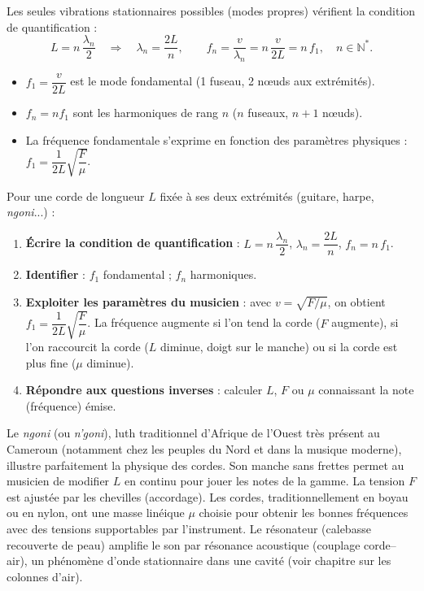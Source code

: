 \documentclass[11pt]{article}
\newcommand{\cle}[1]{{\popxbold\color{popdark}#1}}
\begin{document}
\begin{propriete}
Les seules vibrations stationnaires possibles (modes propres) vérifient la condition de quantification :
\[ L = n\,\frac{\lambda_n}{2} \quad \Rightarrow \quad \lambda_n = \frac{2L}{n}, \qquad f_n = \frac{v}{\lambda_n} = n\,\frac{v}{2L} = n\,f_1, \quad n \in \mathbb{N}^{*}. \]
\begin{itemize}
\item $f_1 = \dfrac{v}{2L}$ est le \cle{mode fondamental} (1 fuseau, 2 nœuds aux extrémités).
\item $f_n = n f_1$ sont les \cle{harmoniques} de rang $n$ ($n$ fuseaux, $n+1$ nœuds).
\item La fréquence fondamentale s'exprime en fonction des paramètres physiques : $f_1 = \dfrac{1}{2L}\sqrt{\dfrac{F}{\mu}}$.
\end{itemize}
\end{propriete}

\begin{methode}
Pour une corde de longueur $L$ fixée à ses deux extrémités (guitare, harpe, \emph{ngoni}...) :
\begin{enumerate}
\item \textbf{Écrire la condition de quantification} : $L = n\,\dfrac{\lambda_n}{2}$, $\lambda_n = \dfrac{2L}{n}$, $f_n = n\,f_1$.
\item \textbf{Identifier} : $f_1$ fondamental ; $f_n$ harmoniques.
\item \textbf{Exploiter les paramètres du musicien} : avec $v = \sqrt{F/\mu}$, on obtient $f_1 = \dfrac{1}{2L}\sqrt{\dfrac{F}{\mu}}$. La fréquence augmente si l'on tend la corde ($F$ augmente), si l'on raccourcit la corde ($L$ diminue, doigt sur le manche) ou si la corde est plus fine ($\mu$ diminue).
\item \textbf{Répondre aux questions inverses} : calculer $L$, $F$ ou $\mu$ connaissant la note (fréquence) émise.
\end{enumerate}
\end{methode}

\begin{savaistu}
Le \emph{ngoni} (ou \emph{n'goni}), luth traditionnel d'Afrique de l'Ouest très présent au Cameroun (notamment chez les peuples du Nord et dans la musique moderne), illustre parfaitement la physique des cordes. Son manche sans frettes permet au musicien de modifier $L$ en continu pour jouer les notes de la gamme. La tension $F$ est ajustée par les chevilles (accordage). Les cordes, traditionnellement en boyau ou en nylon, ont une masse linéique $\mu$ choisie pour obtenir les bonnes fréquences avec des tensions supportables par l'instrument. Le résonateur (calebasse recouverte de peau) amplifie le son par résonance acoustique (couplage corde--air), un phénomène d'onde stationnaire dans une cavité (voir chapitre sur les colonnes d'air).
\end{savaistu}
\end{document}
